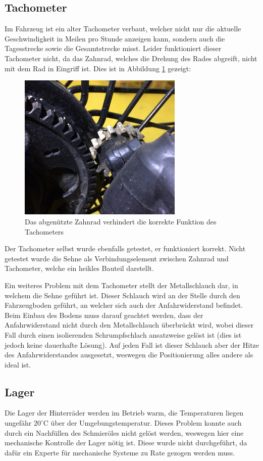 \subsection{Tachometer}
Im Fahrzeug ist ein alter Tachometer verbaut, welcher nicht nur die aktuelle Geschwindigkeit in Meilen pro Stunde anzeigen kann, sondern auch die Tagesstrecke sowie die Gesamtstrecke misst. Leider funktioniert dieser Tachometer nicht, da das Zahnrad, welches die Drehung des Rades abgreift, nicht mit dem Rad in Eingriff ist. Dies ist in Abbildung \ref{fig:Zahnrad} gezeigt:

\begin{figure}[h]
	\centering
		\includegraphics[width=0.70\textwidth]{images/Zahnrad.jpg}
	\caption{Das abgenützte Zahnrad verhindert die korrekte Funktion des Tachometers}
	\label{fig:Zahnrad}
\end{figure}

Der Tachometer selbst wurde ebenfalls getestet, er funktioniert korrekt. Nicht getestet wurde die Sehne als Verbindungselement zwischen Zahnrad und Tachometer, welche ein heikles Bauteil darstellt.

Ein weiteres Problem mit dem Tachometer stellt der Metallschlauch dar, in welchem die Sehne geführt ist. Dieser Schlauch wird an der Stelle durch den Fahrzeugboden geführt, an welcher sich auch der Anfahrwiderstand befindet. Beim Einbau des Bodens muss darauf geachtet werden, dass der Anfahrwiderstand nicht durch den Metallschlauch überbrückt wird, wobei dieser Fall durch einen isolierenden Schrumpfschlach ansatzweise gelöst ist (dies ist jedoch keine dauerhafte Lösung). Auf jeden Fall ist dieser Schlauch aber der Hitze des Anfahrwiderstandes ausgesetzt, weswegen die Positionierung alles andere als ideal ist.

\subsection{Lager}
Die Lager der Hinterräder werden im Betrieb warm, die Temperaturen liegen ungefähr $20^\circ$C über der Umgebungstemperatur. Dieses Problem konnte auch durch ein Nachfüllen des Schmieröles nicht gelöst werden, weswegen hier eine mechanische Kontrolle der Lager nötig ist. Diese wurde nicht durchgeführt, da dafür ein Experte für mechanische Systeme zu Rate gezogen werden muss.

\color{black}